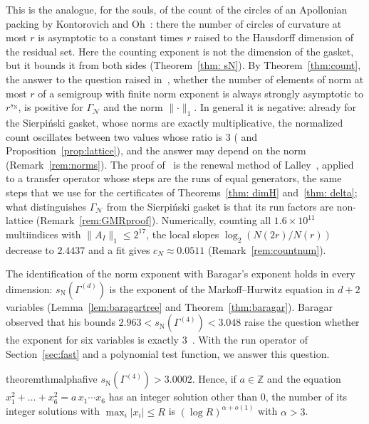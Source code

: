\documentclass[11pt]{amsart}
\theoremstyle{definition}
\theoremstyle{remark}
\newcommand{\Z}{\mathbb Z}
\newcommand{\GN}{\Gamma_{\mathcal N}}
\newcommand{\sN}{s_{\mathrm N}}
\newcommand{\abs}[1]{\lvert #1\rvert}
\newcommand{\norm}[1]{\lVert #1\rVert}
\begin{document}
This is the analogue, for the souls, of the count of the circles of an Apollonian packing by Kontorovich and Oh~\cite{KO11}: there the number of circles of curvature at most $r$ is asymptotic to a constant times $r$ raised to the Hausdorff dimension of the residual set. Here the counting exponent is not the dimension of the gasket, but it bounds it from both sides (Theorem~\ref{thm: sN}). By Theorem~\ref{thm:count}, the answer to the question raised in~\cite[Open Question~1]{DL12}, whether the number of elements of norm at most $r$ of a semigroup with finite norm exponent is always strongly asymptotic to $r^{\sN}$, is positive for $\GN$ and the norm $\norm\cdot_1$. In general it is negative: already for the Sierpi\'nski gasket, whose norms are exactly multiplicative, the normalized count oscillates between two values whose ratio is $3$ (\cite[Motivational Example~3]{DL12} and Proposition~\ref{prop:lattice}), and the answer may depend on the norm (Remark~\ref{rem:norms}). The proof of~\cite{GMR19} is the renewal method of Lalley~\cite{Lal89}, applied to a transfer operator whose steps are the runs of equal generators, the same steps that we use for the certificates of Theorems~\ref{thm: dimH} and~\ref{thm: delta}; what distinguishes $\GN$ from the Sierpi\'nski gasket is that its run factors are non-lattice (Remark~\ref{rem:GMRproof}).
Numerically, counting all $1.6\times10^{11}$ multiindices with $\norm{A_I}_1\le 2^{17}$, the
local slopes $\log_2(N(2r)/N(r))$ decrease to $2.4437$
and a fit gives $c_N\approx0.0511$ (Remark~\ref{rem:countnum}).

The identification of the norm exponent with Baragar's exponent holds in every dimension: $\sN(\Gamma^{(d)})$ is the exponent of the Markoff--Hurwitz equation in $d+2$ variables (Lemma~\ref{lem:baragartree} and Theorem~\ref{thm:baragar}). Baragar observed that his bounds $2.963<\sN(\Gamma^{(4)})<3.048$ raise the question whether the exponent for six variables is exactly $3$~\cite[\S4]{Bar98}. With the run operator of Section~\ref{sec:fast} and a polynomial test function, we answer this question.

\begin{restatable}{theorem}{thmalphafive}\label{thm:alpha5}
$\sN(\Gamma^{(4)})>3.0002$. Hence, if $a\in\Z$ and the equation $x_1^2+\dots+x_6^2=a\,x_1\cdots x_6$ has an integer solution other than $0$, the number of its integer solutions with $\max_i\abs{x_i}\le R$ is $(\log R)^{\alpha+o(1)}$ with $\alpha>3$.
\end{restatable}
\end{document}
